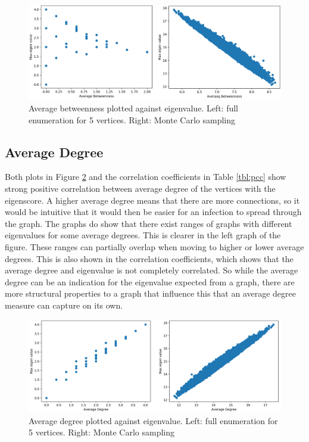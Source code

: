 \documentclass[11pt]{article}
\theoremstyle{definition}
\begin{document}
\begin{figure}[h!]
  \centering
    \includegraphics[width=1\textwidth]{results_graph_measures/Average_Betweenness_c}

  \caption{Average betweenness plotted against eigenvalue. Left: full enumeration for 5 vertices. Right: Monte Carlo sampling}
  \label{fig:measure_ab}
\end{figure}

\subsection{Average Degree}

Both plots in Figure \ref{fig:measure_ad} and the correlation coefficients in Table \ref{tbl:pcc} show strong positive correlation between average degree of the vertices with the eigenscore. A higher average degree means that there are more connections, so it would be intuitive that it would then be easier for an infection to spread through the graph. The graphs do show that there exist ranges of graphs with different eigenvalues for some average degrees. This is clearer in the left graph of the figure. These ranges can partially overlap when moving to higher or lower average degrees. This is also shown in the correlation coefficients, which shows that the average degree and eigenvalue is not completely correlated. So while the average degree can be an indication for the eigenvalue expected from a graph, there are more structural properties to a graph that influence this that an average degree measure can capture on its own.


\begin{figure}[h!]
  \centering
    \includegraphics[width=1\textwidth]{results_graph_measures/Average_Degree_c}

  \caption{Average degree plotted against eigenvalue. Left: full enumeration for 5 vertices. Right: Monte Carlo sampling}
  \label{fig:measure_ad}
\end{figure}
\end{document}
